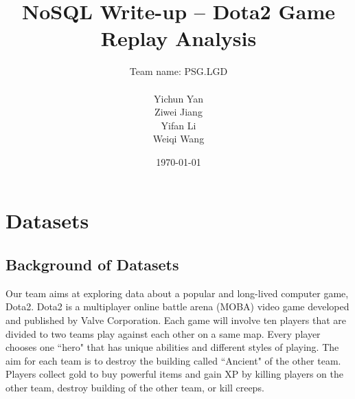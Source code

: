 \documentclass{article}
\title{NoSQL Write-up -- Dota2 Game Replay Analysis}
\author{
    Team name: PSG.LGD \\ \\
    Yichun Yan \\
    Ziwei Jiang \\
    Yifan Li \\
    Weiqi Wang
}
\date{\today}
\begin{document}
\maketitle

\tableofcontents
\clearpage


\section{Datasets}

\subsection{Background of Datasets}

Our team aims at exploring data about a popular and long-lived computer game, Dota2. Dota2 is a multiplayer online battle arena (\gls{MOBA}) video game developed and published by Valve Corporation. Each game will involve ten players that are divided to two teams play against each other on a same map. Every player chooses one ``hero" that has unique abilities and different styles of playing. The aim for each team is to destroy the building called ``\gls{Ancient}" of the other team. Players collect \gls{gold} to buy powerful items and gain \gls{XP} by killing players on the other team, destroy building of the other team, or kill \gls{creeps}.
\end{document}
